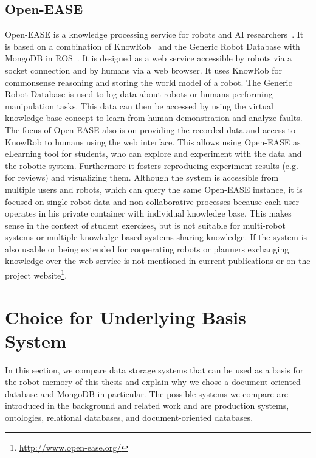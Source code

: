\subsection{Open-EASE}
\label{sec:openease}
Open-EASE is a knowledge processing service for robots and AI
researchers~\cite{OpenEASE}. It is based on a combination of
KnowRob~\cite{KnowRob} and the Generic Robot Database with MongoDB in
ROS~\cite{RoboDB}. It is designed as a web service accessible by
robots via a socket connection and by humans via a web browser. It
uses KnowRob for commonsense reasoning and storing the world model of
a robot. The Generic Robot Database is used to log data about robots
or humans performing manipulation tasks. This data can then be
accessed by using the virtual knowledge base concept to learn from
human demonstration and analyze faults. The focus of Open-EASE also is
on providing the recorded data and access to KnowRob to humans using
the web interface. This allows using Open-EASE as eLearning tool for
students, who can explore and experiment with the data and the robotic
system. Furthermore it fosters reproducing experiment results
(e.g. for reviews) and visualizing them. Although the system is
accessible from multiple users and robots, which can query the same
Open-EASE instance, it is focused on single robot data and non
collaborative processes because each user operates in his private
container with individual knowledge base. This makes sense in the
context of student exercises, but is not suitable for multi-robot
systems or multiple knowledge based systems sharing knowledge. If the
system is also usable or being extended for cooperating robots or
planners exchanging knowledge over the web service is not mentioned in
current publications or on the project
website\footnote{\url{http://www.open-ease.org/}}.


\section{Choice for Underlying Basis System}
\label{sec:basis-representation}
In this section, we compare data storage systems that can be used as a
basis for the robot memory of this thesis and explain why we chose a
document-oriented database and MongoDB in particular. The possible
systems we compare are introduced in
the background and related work and are production systems,
ontologies, relational databases, and document-oriented databases.

